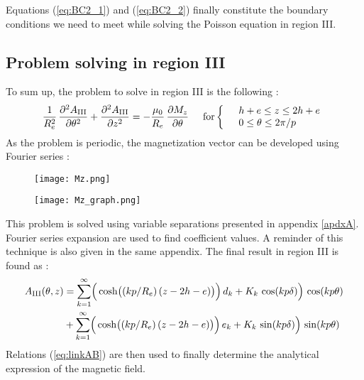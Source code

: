 Equations (\ref{eq:BC2_1}) and (\ref{eq:BC2_2}) finally constitute the boundary conditions we need to meet while solving the Poisson equation in region \rm III. 

\subsection*{Problem solving in region III}

To sum up, the problem to solve in region \rm III is the following :
\begin{equation}
\label{eq:PoissonIII}
 \dfrac{1}{R_e^2}\, \dfrac{\partial^2 A_{\rm III}}{\partial \theta ^2}
+ \dfrac{\partial^2 A_{\rm III}}{\partial z^2}
= -\dfrac{\mu_0}{R_e}\, \dfrac{\partial M_z}{\partial \theta}
\hspace{.5cm} \text{for}
\left\{
\begin{array}{lll}
& h+e \leq z \leq 2h+e \\
& 0 \leq \theta \leq 2\pi/p
 \end{array}
\right.
\end{equation}
As the problem is periodic, the magnetization vector can be developed using Fourier series :

\begin{figure}[H]
    \centering
    \begin{minipage}[b]{0.5\linewidth}
     \flushleft
    \texttt{[image: Mz.png]}
    \vspace{1.5cm}
    \end{minipage}%
    \begin{minipage}[b]{0.45\linewidth}
    \flushright
    \texttt{[image: Mz\_graph.png]}
    \end{minipage}
\end{figure}

This problem is solved using variable separations presented in appendix \ref{apdxA}. Fourier series expansion are used to find coefficient values. A reminder of this technique is also given in the same appendix. The final result in region \rm III is found as :
\begin{align*}
A_{\rm III} (\theta, z) 
&= \sum\limits_{k=1}^{\infty}\Bigr( \cosh \bigr((kp/R_e)\, (z-2h-e)\bigr) \Bigr)\,
d_k + K_k\, \cos(kp\delta) \Bigr)\, \cos(kp\theta) \\
&+ \sum\limits_{k=1}^{\infty}\Bigr( \cosh \bigr((kp/R_e)\, (z-2h-e)\bigr) \Bigr)\,
e_k + K_k\, \sin(kp\delta) \Bigr)\, \sin(kp\theta)
\end{align*}
Relations (\ref{eq:linkAB}) are then used to finally determine the analytical expression of the magnetic field.




